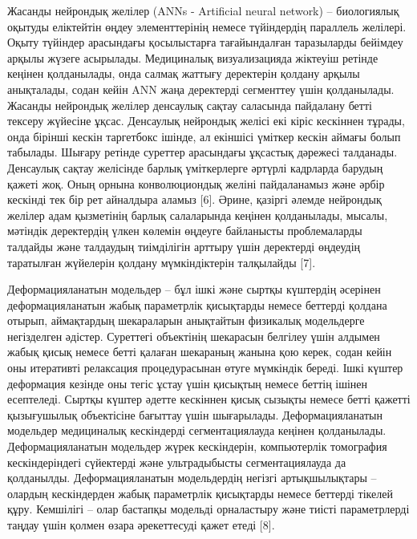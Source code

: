 \begin{multicols}{2}
Жасанды нейрондық желілер (ANNs - Artificial neural network) --
биологиялық оқытуды еліктейтін өңдеу элементтерінің немесе түйіндердің
параллель желілері. Оқыту түйіндер арасындағы қосылыстарға тағайындалған
таразыларды бейімдеу арқылы жүзеге асырылады. Медициналық визуализацияда
жіктеуіш ретінде кеңінен қолданылады, онда салмақ жаттығу деректерін
қолдану арқылы анықталады, содан кейін ANN жаңа деректерді сегменттеу
үшін қолданылады. Жасанды нейрондық желілер денсаулық сақтау саласында
пайдалану бетті тексеру жүйесіне ұқсас. Денсаулық нейрондық желісі екі
кіріс кескіннен тұрады, онда бірінші кескін таргетбокс ішінде, ал
екіншісі үміткер кескін аймағы болып табылады. Шығару ретінде суреттер
арасындағы ұқсастық дәрежесі талданады. Денсаулық сақтау желісінде
барлық үміткерлерге әртүрлі кадрларда барудың қажеті жоқ. Оның орнына
конволюциондық желіні пайдаланамыз және әрбір кескінді тек бір рет
айналдыра аламыз {[}6{]}. Әрине, қазіргі әлемде нейрондық желілер адам
қызметінің барлық салаларында кеңінен қолданылады, мысалы, мәтіндік
деректердің үлкен көлемін өңдеуге байланысты проблемаларды талдайды және
талдаудың тиімділігін арттыру үшін деректерді өңдеудің таратылған
жүйелерін қолдану мүмкіндіктерін талқылайды {[}7{]}.

Деформацияланатын модельдер -- бұл ішкі және сыртқы күштердің әсерінен
деформацияланатын жабық параметрлік қисықтарды немесе беттерді қолдана
отырып, аймақтардың шекараларын анықтайтын физикалық модельдерге
негізделген әдістер. Суреттегі объектінің шекарасын белгілеу үшін
алдымен жабық қисық немесе бетті қалаған шекараның жанына қою керек,
содан кейін оны итеративті релаксация процедурасынан өтуге мүмкіндік
береді. Ішкі күштер деформация кезінде оны тегіс ұстау үшін қисықтың
немесе беттің ішінен есептеледі. Сыртқы күштер әдетте кескіннен қисық
сызықты немесе бетті қажетті қызығушылық объектісіне бағыттау үшін
шығарылады. Деформацияланатын модельдер медициналық кескіндерді
сегментациялауда кеңінен қолданылады. Деформацияланатын модельдер жүрек
кескіндерін, компьютерлік томография кескіндеріндегі сүйектерді және
ультрадыбысты сегментациялауда да қолданылды. Деформацияланатын
модельдердің негізгі артықшылықтары -- олардың кескіндерден жабық
параметрлік қисықтарды немесе беттерді тікелей құру. Кемшілігі -- олар
бастапқы модельді орналастыру және тиісті параметрлерді таңдау үшін
қолмен өзара әрекеттесуді қажет етеді {[}8{]}.


\end{multicols}
